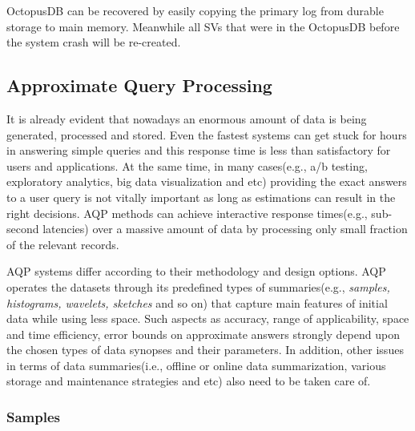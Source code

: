\documentclass[10pt, conference, compsocconf]{IEEEtran}
\begin{document}
OctopusDB can be recovered by easily copying the primary log from durable storage to main memory. Meanwhile all SVs that were in the OctopusDB before the system crash will be re-created.

\subsection{Approximate Query Processing}


It is already evident that nowadays an enormous amount of data is being generated, processed and stored. Even the fastest systems can get stuck for hours in answering simple queries and this response time is less than satisfactory for users and applications. At the same time, in many cases(e.g., a/b testing, exploratory analytics, big data visualization and etc) providing the exact answers to a user query is not vitally important as long as estimations can result in the right decisions. AQP methods can achieve interactive response times(e.g., sub-second latencies) over a massive amount of data by processing only small fraction of the relevant records. 

AQP systems differ according to their methodology and design options. AQP operates the datasets through its predefined types of summaries(e.g., \textit{samples, histograms, wavelets, sketches} and so on) that capture main features of initial data while using less space. Such aspects as accuracy, range of applicability, space and time efficiency, error bounds on approximate answers strongly depend upon the chosen types of data synopses and their parameters. In addition, other issues in terms of data summaries(i.e., offline or online data summarization, various storage and maintenance strategies and etc) also need to be taken care of.\\

\subsubsection{\textbf{Samples}}
\end{document}
